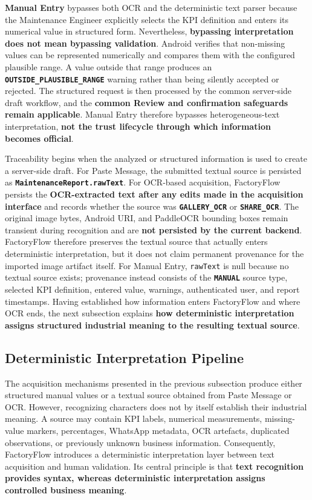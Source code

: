 \textbf{Manual Entry} bypasses both OCR and the deterministic text parser because the Maintenance Engineer explicitly selects the KPI definition and enters its numerical value in structured form. Nevertheless, \textbf{bypassing interpretation does not mean bypassing validation}. Android verifies that non-missing values can be represented numerically and compares them with the configured plausible range. A value outside that range produces an \textbf{\texttt{OUTSIDE\_PLAUSIBLE\_RANGE}} warning rather than being silently accepted or rejected. The structured request is then processed by the common server-side draft workflow, and the \textbf{common Review and confirmation safeguards remain applicable}. Manual Entry therefore bypasses heterogeneous-text interpretation, \textbf{not the trust lifecycle through which information becomes official}.

Traceability begins when the analyzed or structured information is used to create a server-side draft. For Paste Message, the submitted textual source is persisted as \textbf{\texttt{MaintenanceReport.rawText}}. For OCR-based acquisition, FactoryFlow persists the \textbf{OCR-extracted text after any edits made in the acquisition interface} and records whether the source was \textbf{\texttt{GALLERY\_OCR}} or \textbf{\texttt{SHARE\_OCR}}. The original image bytes, Android URI, and PaddleOCR bounding boxes remain transient during recognition and are \textbf{not persisted by the current backend}. FactoryFlow therefore preserves the textual source that actually enters deterministic interpretation, but it does not claim permanent provenance for the imported image artifact itself. For Manual Entry, \texttt{rawText} is null because no textual source exists; provenance instead consists of the \textbf{\texttt{MANUAL}} source type, selected KPI definition, entered value, warnings, authenticated user, and report timestamps. Having established how information enters FactoryFlow and where OCR ends, the next subsection explains \textbf{how deterministic interpretation assigns structured industrial meaning to the resulting textual source}.

\subsection{Deterministic Interpretation Pipeline}
\label{subsec:deterministic-interpretation-pipeline}

The acquisition mechanisms presented in the previous subsection produce either structured manual values or a textual source obtained from Paste Message or OCR. However, recognizing characters does not by itself establish their industrial meaning. A source may contain KPI labels, numerical measurements, missing-value markers, percentages, WhatsApp metadata, OCR artefacts, duplicated observations, or previously unknown business information. Consequently, FactoryFlow introduces a deterministic interpretation layer between text acquisition and human validation. Its central principle is that \textbf{text recognition provides syntax, whereas deterministic interpretation assigns controlled business meaning}.

